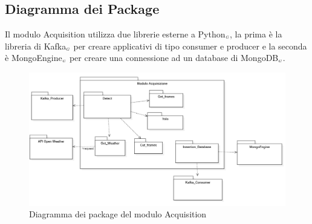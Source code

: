 \subsection{Diagramma dei Package}\label{ArchitetturaDelProdottoArchitetturaModuloAcquisitionDiagrammaDeiPackage}
Il modulo Acquisition utilizza due librerie esterne a Python$_{\scaleto{G}{3pt}}$, la prima è la libreria di Kafka$_{\scaleto{G}{3pt}}$ per creare applicativi di tipo consumer e producer e la seconda è MongoEngine$_{\scaleto{G}{3pt}}$ per creare una connessione ad un database di MongoDB$_{\scaleto{G}{3pt}}$.
\begin{figure}[H]
  \begin{center}
    \includegraphics[scale=0.6]{../immagini/diag_PB/diag_pack_acqui.png}
    \caption{Diagramma dei package del modulo Acquisition}
  \end{center}
\end{figure}

